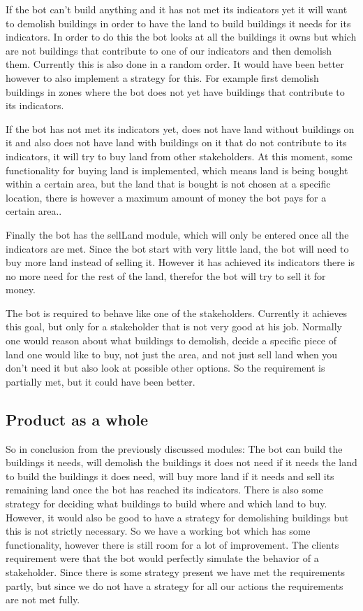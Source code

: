 If the bot can't build anything and it has not met its indicators yet it will want to demolish buildings in order to have the land to build buildings it needs for its indicators. In order to do this the bot looks at all the buildings it owns but which are not buildings that contribute to one of our indicators and then demolish them. Currently this is also done in a random order. It would have been better however to also implement a strategy for this. For example first demolish buildings in zones where the bot does not yet have buildings that contribute to its indicators. 

If the bot has not met its indicators yet, does not have land without buildings on it and also does not have land with buildings on it that do not contribute to its indicators, it will try to buy land from other stakeholders. At this moment, some functionality for buying land is implemented, which means land is being bought within a certain area, but the land that is bought is not chosen at a specific location, there is however a maximum amount of money the bot pays for a certain area..

Finally the bot has the sellLand module, which will only be entered once all the indicators are met. Since the bot start with very little land, the bot will need to buy more land instead of selling it. However it has achieved its indicators there is no more need for the rest of the land, therefor the bot will try to sell it for money.

The bot is required to behave like one of the stakeholders. Currently it achieves this goal, but only for a stakeholder that is not very good at his job. Normally one would reason about what buildings to demolish, decide a specific piece of land one would like to buy, not just the area, and not just sell land when you don't need it but also look at possible other options. So the requirement is partially met, but it could have been better.

\subsection{Product as a whole}
So in conclusion from the previously discussed modules: The bot can build the buildings it needs, will demolish the buildings it does not need if it needs the land to build the buildings it does need, will buy more land if it needs and sell its remaining land once the bot has reached its indicators. There is also some strategy for deciding what buildings to build where and which land to buy. However, it would also be good to have a strategy for demolishing buildings but this is not strictly necessary. So we have a working bot which has some functionality, however there is still room for a lot of improvement. The clients requirement were that the bot would perfectly simulate the behavior of a stakeholder. Since there is some strategy present we have met the requirements partly, but since we do not have a strategy for all our actions the requirements are not met fully. 


